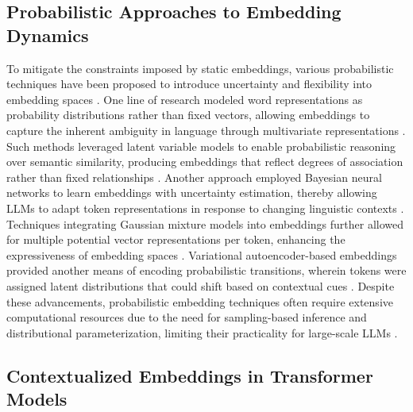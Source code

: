 \documentclass{article}
\begin{document}
\subsection{Probabilistic Approaches to Embedding Dynamics}

To mitigate the constraints imposed by static embeddings, various probabilistic techniques have been proposed to introduce uncertainty and flexibility into embedding spaces \cite{roova2024exploring}. One line of research modeled word representations as probability distributions rather than fixed vectors, allowing embeddings to capture the inherent ambiguity in language through multivariate representations \cite{rikitoshi2024automated}. Such methods leveraged latent variable models to enable probabilistic reasoning over semantic similarity, producing embeddings that reflect degrees of association rather than fixed relationships \cite{watanabe2024empower}. Another approach employed Bayesian neural networks to learn embeddings with uncertainty estimation, thereby allowing LLMs to adapt token representations in response to changing linguistic contexts \cite{zakiev2024emergent}. Techniques integrating Gaussian mixture models into embeddings further allowed for multiple potential vector representations per token, enhancing the expressiveness of embedding spaces \cite{vitiello2024context}. Variational autoencoder-based embeddings provided another means of encoding probabilistic transitions, wherein tokens were assigned latent distributions that could shift based on contextual cues \cite{mcintosh2023culturally}. Despite these advancements, probabilistic embedding techniques often require extensive computational resources due to the need for sampling-based inference and distributional parameterization, limiting their practicality for large-scale LLMs \cite{hou2024benchmarking}.

\subsection{Contextualized Embeddings in Transformer Models}
\end{document}
